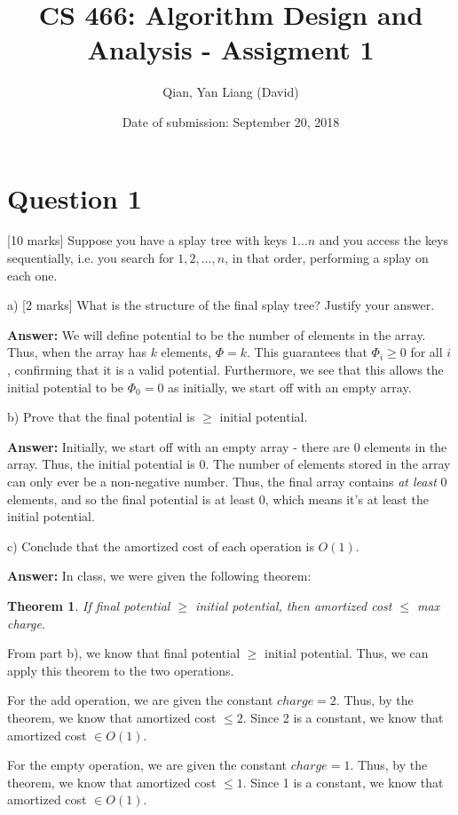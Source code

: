\documentclass{article}
\title{CS 466: Algorithm Design and Analysis - Assigment 1}
\author{Qian, Yan Liang (David)}
\date{Date of submission: September 20, 2018}
\newtheorem{theorem}{Theorem}
\begin{document}
\newpage

\section{Question 1}

[10 marks] Suppose you have a splay tree with keys $1 \ldots n$ and you access the keys sequentially,
i.e. you search for $1, 2, \ldots, n$, in that order, performing a splay on each one.

a) [2 marks] What is the structure of the final splay tree? Justify your answer.





\newline

\textbf{Answer:} We will define potential to be the number of elements in the array.
Thus, when the array has $k$ elements, $\Phi = k$.
This guarantees that $\Phi_i \geq 0$ for all $i$, confirming that it is a valid potential.
Furthermore, we see that this allows the initial potential to be $\Phi_0 = 0$ as initially, we start off with
an empty array.
\newline

b) Prove that the final potential is $\geq$ initial potential.
\newline

\textbf{Answer:} Initially, we start off with an empty array - there are 0 elements in the array. Thus, the initial
potential is 0.
The number of elements stored in the array can only ever be a non-negative number. Thus, the final array contains
\textit{at least} 0 elements, and so the final potential is at least 0, which means it's at least the initial potential.
\newline

c) Conclude that the amortized cost of each operation is $O(1)$.
\newline

\textbf{Answer:} In class, we were given the following theorem:

\begin{theorem}
    If final potential $\geq$ initial potential, then amortized cost $\leq$ max charge.
\end{theorem}

From part b), we know that final potential $\geq$ initial potential. Thus, we can apply this theorem to the two
operations.

For the add operation, we are given the constant $charge = 2$. Thus, by the theorem, we know that amortized cost $\leq
2$. Since 2 is a constant, we know that amortized cost $\in O(1)$.

For the empty operation, we are given the constant $charge = 1$. Thus, by the theorem, we know that amortized cost $\leq
1$. Since 1 is a constant, we know that amortized cost $\in O(1)$.
\newline
\end{document}
